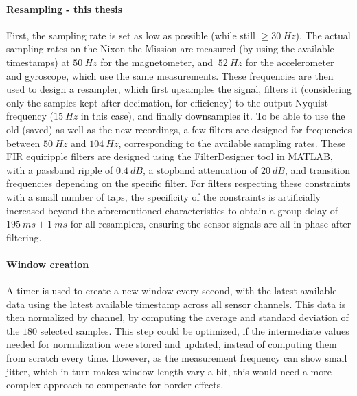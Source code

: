 \documentclass[a4paper, oneside]{discothesis}
\begin{document}
\paragraph{Resampling - this thesis} First, the sampling rate is set as low as possible (while still $\geq 30~Hz$). The actual sampling rates on the Nixon the Mission are measured (by using the available timestamps) at $50~Hz$ for the magnetometer, and $~52~Hz$ for the accelerometer and gyroscope, which use the same measurements. These frequencies are then used to design a resampler, which first upsamples the signal, filters it (considering only the samples kept after decimation, for efficiency) to the output Nyquist frequency ($15~Hz$ in this case), and finally downsamples it. To be able to use the old (saved) as well as the new recordings, a few filters are designed for frequencies between $50~Hz$ and $104~Hz$, corresponding to the available sampling rates. These FIR equiripple filters are designed using the FilterDesigner tool in MATLAB, with a passband ripple of $0.4~dB$, a stopband attenuation of $20~dB$, and transition frequencies depending on the specific filter. For filters respecting these constraints with a small number of taps, the specificity of the constraints is artificially increased beyond the aforementioned characteristics to obtain a group delay of $195~ms\pm1~ms$ for all resamplers, ensuring the sensor signals are all in phase after filtering.

\paragraph{Window creation} A timer is used to create a new window every second, with the latest available data using the latest available timestamp across all sensor channels. This data is then normalized by channel, by computing the average and standard deviation of the $180$ selected samples. This step could be optimized, if the intermediate values needed for normalization were stored and updated, instead of computing them from scratch every time. However, as the measurement frequency can show small jitter, which in turn makes window length vary a bit, this would need a more complex approach to compensate for border effects.
\end{document}
